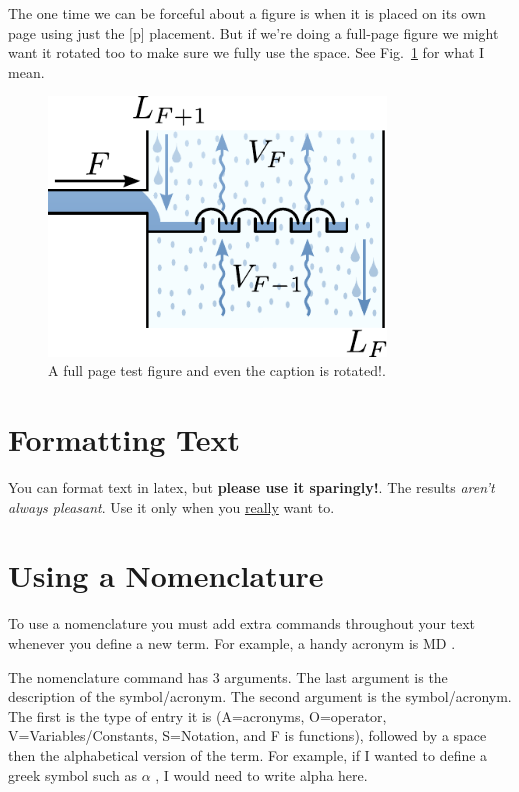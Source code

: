 \documentclass[12pt]{UoAThesis}
\begin{document}
The one time we can be forceful about a figure is when it is placed on
its own page using just the [p] placement. But if we're doing a
full-page figure we might want it rotated too to make sure we fully
use the space. See Fig.~\ref{fig:testfig2} for what I mean.
\begin{figure}
  \centering
  \includegraphics[clip,width=0.8\textwidth]{figures/testfig}
  \caption{\label{fig:testfig2} A full page test figure and even the caption is rotated!.}
\end{figure}

\section{Formatting Text}
You can format text in latex, but {\bf please use it sparingly!}. The
results {\em aren't always pleasant}. Use it only when you
\underline{really} want to.

\section{Using a Nomenclature}
To use a nomenclature you must add extra commands throughout your text
whenever you define a new term. For example, a handy acronym is MD
. 

The nomenclature command has 3 arguments. The last argument is the
description of the symbol/acronym. The second argument is the
symbol/acronym. The first is the type of entry it is (A=acronyms,
O=operator, V=Variables/Constants, S=Notation, and F is functions),
followed by a space then the alphabetical version of the term. For
example, if I wanted to define a greek symbol such as $\alpha$
, I would need to write alpha
here.
\end{document}
